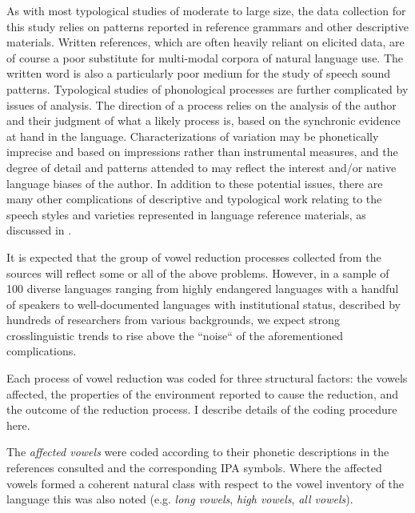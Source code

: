   As with most typological studies of moderate to large size, the data collection for this study relies on patterns reported in reference grammars and other descriptive materials. Written references, which are often heavily reliant on elicited data, are of course a poor substitute for multi-modal corpora of natural language use. The written word is also a particularly poor medium for the study of speech sound patterns. Typological studies of phonological processes are further complicated by issues of analysis. The direction of a process relies on the analysis of the author and their judgment of what a likely process is, based on the synchronic evidence at hand in the language. Characterizations of variation may be phonetically imprecise and based on impressions rather than instrumental measures, and the degree of detail and patterns attended to may reflect the interest and/or native language biases of the author. In addition to these potential issues, there are many other complications of descriptive and typological work relating to the speech styles and varieties represented in language reference materials, as discussed in .

  It is expected that the group of vowel reduction processes collected from the sources will reflect some or all of the above problems. However, in a sample of 100 diverse languages ranging from highly endangered languages with a handful of speakers to well-documented languages with institutional status, described by hundreds of researchers from various backgrounds, we expect strong crosslinguistic trends to rise above the “noise“ of the aforementioned complications.

  Each process of vowel reduction was coded for three structural factors: the vowels affected, the properties of the environment reported to cause the reduction, and the outcome of the reduction process. I describe details of the coding procedure here.

  The \textit{affected vowels} were coded according to their phonetic descriptions in the references consulted and the corresponding IPA symbols. Where the affected vowels formed a coherent natural class with respect to the vowel inventory of the language this was also noted (e.g. \textit{long vowels}, \textit{high vowels}, \textit{all vowels}).

